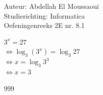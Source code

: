\documentclass[a4paper]{article}
\begin{document}
  
\noindent \large Auteur: Abdellah El Moussaoui \\
\noindent \large Studierichting: Informatica\\
\noindent \large Oefeningenreeks 2E nr. 8.1\\

\medskip

\normalsize
$3^x = 27$\\

$\Leftrightarrow \log_3 (3^x) = \log_3 27$\\

$\Leftrightarrow x = \log_3 3^3$\\

$\Leftrightarrow x = 3$

\begin{thebibliography}{999}
\end{thebibliography}
\end{document}
